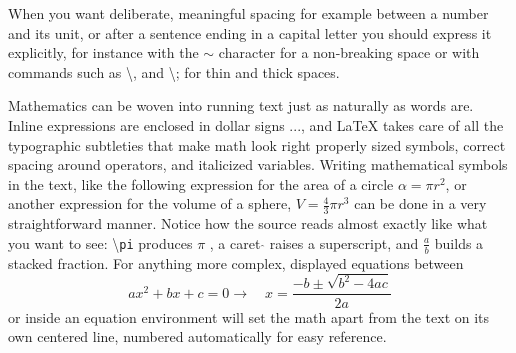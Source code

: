\documentclass[12pt,a4paper]{article}
\begin{document}
When you want deliberate, meaningful spacing for example between a number and its unit, or after a sentence ending in a capital letter you should express it explicitly, for instance with the $\sim$ character for a non-breaking space or with commands such as \textbackslash, and \textbackslash; for thin and thick spaces.

Mathematics can be woven into running text just as naturally as words are. Inline expressions are enclosed in dollar signs $...$, and \LaTeX{} takes care of all the typographic subtleties that make math look right properly sized symbols, correct spacing around operators, and italicized variables. Writing mathematical symbols in the text, like the following expression for the area of a circle $\alpha = \pi r^2$, or another expression for the volume of a sphere, $V = \frac{4}{3} \pi r^3$ can be done in a very straightforward manner.
 Notice how the source reads almost exactly like what you want to see: \textbackslash \texttt{pi} produces $\pi$ , a caret $\hat{}$ raises a superscript, and $\frac{a}{b}$ builds a stacked fraction. For anything more complex, displayed equations between \[ ax^2 + bx + c = 0 \rightarrow \quad x = \frac{-b \pm \sqrt{b^2 - 4ac}}{2a} \] or inside an equation environment will set the math apart from the text on its own centered line, numbered automatically for easy reference.
\end{document}
